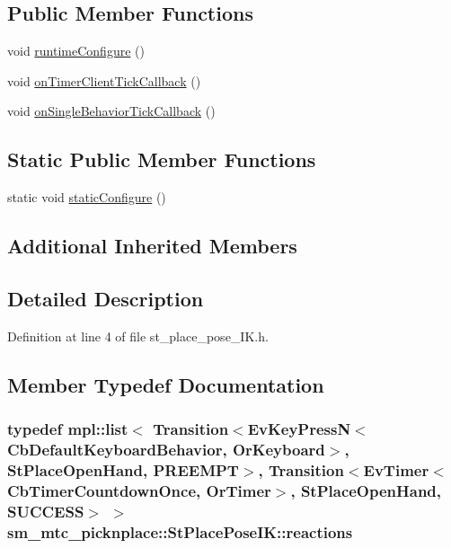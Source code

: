 \subsection*{Public Member Functions}
\begin{DoxyCompactItemize}
\item 
void \hyperlink{structsm__mtc__picknplace_1_1StPlacePoseIK_a28c72606ae8e1169c47faffc90d90773}{runtime\+Configure} ()
\item 
void \hyperlink{structsm__mtc__picknplace_1_1StPlacePoseIK_a87018c2d9807a1c16346c1cf3cd2b554}{on\+Timer\+Client\+Tick\+Callback} ()
\item 
void \hyperlink{structsm__mtc__picknplace_1_1StPlacePoseIK_a7da7c8c3cb810bc474b10189c919467a}{on\+Single\+Behavior\+Tick\+Callback} ()
\end{DoxyCompactItemize}
\subsection*{Static Public Member Functions}
\begin{DoxyCompactItemize}
\item 
static void \hyperlink{structsm__mtc__picknplace_1_1StPlacePoseIK_a9ed8aa162b354dfd0cf56def940e968f}{static\+Configure} ()
\end{DoxyCompactItemize}
\subsection*{Additional Inherited Members}


\subsection{Detailed Description}


Definition at line 4 of file st\+\_\+place\+\_\+pose\+\_\+\+I\+K.\+h.



\subsection{Member Typedef Documentation}
\subsubsection[{\texorpdfstring{reactions}{reactions}}]{\setlength{\rightskip}{0pt plus 5cm}typedef mpl\+::list$<$ Transition$<$Ev\+Key\+PressN$<$Cb\+Default\+Keyboard\+Behavior, {\bf Or\+Keyboard}$>$, {\bf St\+Place\+Open\+Hand}, {\bf P\+R\+E\+E\+M\+PT}$>$, Transition$<$Ev\+Timer$<$Cb\+Timer\+Countdown\+Once, {\bf Or\+Timer}$>$, {\bf St\+Place\+Open\+Hand}, {\bf S\+U\+C\+C\+E\+SS}$>$ $>$ {\bf sm\+\_\+mtc\+\_\+picknplace\+::\+St\+Place\+Pose\+I\+K\+::reactions}}\hypertarget{structsm__mtc__picknplace_1_1StPlacePoseIK_a54f5ca0ff9e72a6de642c13a86d20813}{}\label{structsm__mtc__picknplace_1_1StPlacePoseIK_a54f5ca0ff9e72a6de642c13a86d20813}


